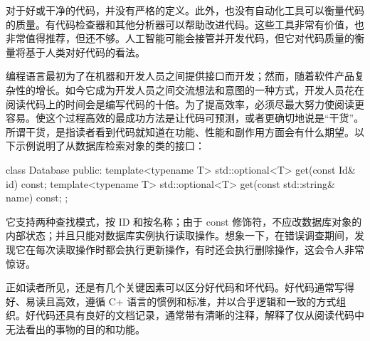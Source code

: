 对于好或干净的代码，并没有严格的定义。此外，也没有自动化工具可以衡量代码的质量。有代码检查器和其他分析器可以帮助改进代码。这些工具非常有价值，也非常值得推荐，但还不够。人工智能可能会接管并开发代码，但它对代码质量的衡量将基于人类对好代码的看法。

编程语言最初为了在机器和开发人员之间提供接口而开发；然而，随着软件产品复杂性的增长。如今它成为开发人员之间交流想法和意图的一种方式，开发人员花在阅读代码上的时间会是编写代码的十倍。为了提高效率，必须尽最大努力使阅读更容易。使这个过程高效的最成功方法是让代码可预测，或者更确切地说是“干货”。所谓干货，是指读者看到代码就知道在功能、性能和副作用方面会有什么期望。以下示例说明了从数据库检索对象的类的接口：

\begin{cpp}
class Database {
public:
    template<typename T>
    std::optional<T> get(const Id& id) const;
    template<typename T>
    std::optional<T> get(const std::string& name) const;
};
\end{cpp}

它支持两种查找模式，按 ID 和按名称；由于 const 修饰符，不应改数据库对象的内部状态；并且只能对数据库实例执行读取操作。想象一下，在错误调查期间，发现它在每次读取操作时都会执行更新操作，有时还会执行删除操作，这会令人非常惊讶。

正如读者所见，还是有几个关键因素可以区分好代码和坏代码。好代码通常写得好、易读且高效，遵循 C+ 语言的惯例和标准，并以合乎逻辑和一致的方式组织。好代码还具有良好的文档记录，通常带有清晰的注释，解释了仅从阅读代码中无法看出的事物的目的和功能。
